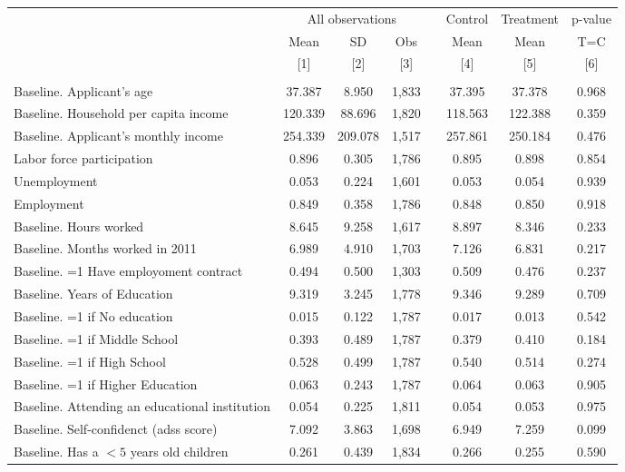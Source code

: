 \begin{tabular}{lccccccc}  \hline \hline
& \multicolumn{3}{c}{All observations}                  && Control              & Treatment             & p-value               \\ \cline{2-4}
& Mean                  & SD                    & Obs                   && Mean                 & Mean                  & T=C                   \\
& [1]                   & [2]                   & [3]                   && [4]                  & [5]                   & [6]                   \\ \hline
\\
Baseline. Applicant's age & 37.387 & 8.950 &1,833 &&37.395 &37.378 &0.968 \\
Baseline. Household per capita income & 120.339 & 88.696 &1,820 &&118.563 &122.388 &0.359 \\
Baseline. Applicant's monthly income & 254.339 & 209.078 &1,517 &&257.861 &250.184 &0.476 \\
Labor force participation  & 0.896 & 0.305 &1,786 &&0.895 &0.898 &0.854 \\
Unemployment & 0.053 & 0.224 &1,601 &&0.053 &0.054 &0.939 \\
Employment & 0.849 & 0.358 &1,786 &&0.848 &0.850 &0.918 \\
Baseline. Hours worked & 8.645 & 9.258 &1,617 &&8.897 &8.346 &0.233 \\
Baseline. Months worked in 2011 & 6.989 & 4.910 &1,703 &&7.126 &6.831 &0.217 \\
Baseline. =1 Have employoment contract & 0.494 & 0.500 &1,303 &&0.509 &0.476 &0.237 \\
Baseline. Years of Education & 9.319 & 3.245 &1,778 &&9.346 &9.289 &0.709 \\
Baseline. =1 if No education & 0.015 & 0.122 &1,787 &&0.017 &0.013 &0.542 \\
Baseline. =1 if Middle School & 0.393 & 0.489 &1,787 &&0.379 &0.410 &0.184 \\
Baseline. =1 if High School & 0.528 & 0.499 &1,787 &&0.540 &0.514 &0.274 \\
Baseline. =1 if Higher Education & 0.063 & 0.243 &1,787 &&0.064 &0.063 &0.905 \\
Baseline.  Attending an educational institution & 0.054 & 0.225 &1,811 &&0.054 &0.053 &0.975 \\
Baseline.  Self-confidenct (adss score) & 7.092 & 3.863 &1,698 &&6.949 &7.259 &0.099 \\
Baseline. Has a $<5$ years old children & 0.261 & 0.439 &1,834 &&0.266 &0.255 &0.590 \\

\end{tabular}
